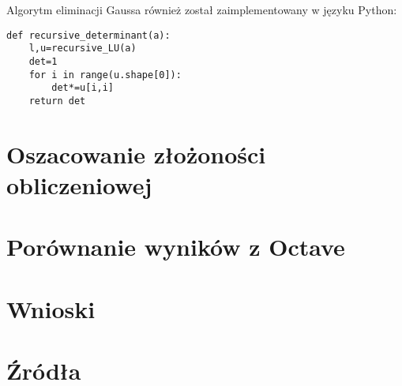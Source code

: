 \documentclass{article}
\begin{document}
Algorytm eliminacji Gaussa również został zaimplementowany w języku Python:

\begin{verbatim}
def recursive_determinant(a):
    l,u=recursive_LU(a)
    det=1
    for i in range(u.shape[0]):
        det*=u[i,i]
    return det

\end{verbatim}





\section{Oszacowanie złożoności obliczeniowej}


\section{Porównanie wyników z Octave}



\section{Wnioski}



\section{Źródła}
\end{document}
